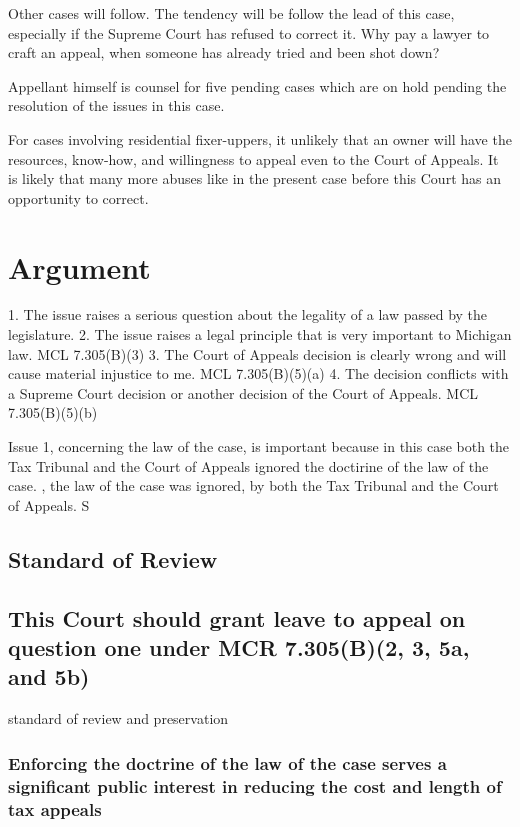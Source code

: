 \documentclass[12pt,\documentclassflag]{michiganCourtOfAppealsBrief}
\begin{document}
Other cases will follow. The tendency will be follow the lead of this case, especially if the Supreme Court has refused to correct it. Why pay a lawyer to craft an appeal, when someone has already tried and been shot down?

Appellant himself is counsel for five pending cases which are on hold pending the resolution of the issues in this case.

For cases involving residential fixer-uppers, it unlikely that an owner will have the resources, know-how, and willingness to appeal even to the Court of Appeals. It is likely that many more abuses like in the present case before this Court has an opportunity to correct.


\section{Argument}


1. The issue raises a serious question about the legality of a law passed by the legislature.
2. The issue raises a legal principle that is very important to Michigan law. MCL 7.305(B)(3)
3. The Court of Appeals decision is clearly wrong and will cause material injustice to me. MCL 7.305(B)(5)(a)
4. The decision conflicts with a Supreme Court decision or another decision of the Court of Appeals. MCL 7.305(B)(5)(b)


Issue 1, concerning the law of the case, is important because in this case both the Tax Tribunal and the Court of Appeals ignored the doctirine of the law of the case. , the law of the case was ignored, by both the Tax Tribunal and the Court of Appeals. S
\subsection{Standard of Review}



\subsection{This Court should grant leave to appeal on question one under MCR 7.305(B)(2, 3, 5a, and 5b)}

standard of review and preservation

\subsubsection{Enforcing the doctrine of the law of the case serves a significant public interest in reducing the cost and length of tax appeals}
\end{document}
